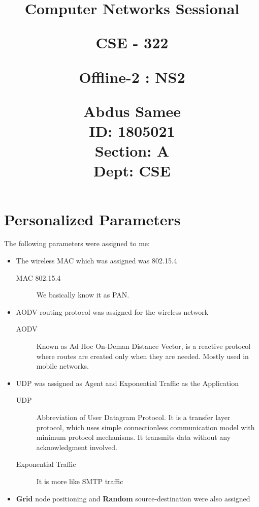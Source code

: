 \documentclass{article}
\title{%
  \begin{center}
        \vspace*{1cm}
            
        \Huge
        \textbf{Computer Networks Sessional}
            
        \vspace{0.5cm}
        \LARGE
        CSE - 322
            
        \vspace{1.5cm}
            
        \textbf{Offline-2 : NS2}
                        
        \vspace{0.8cm}
                        
        \Large
        Abdus Samee\\
        ID: 1805021\\
        Section: A\\
        Dept: CSE\\
    \end{center}
  }
\date{}
\begin{document}
\maketitle
\newpage

\section{Personalized Parameters}
The following parameters were assigned to me:

\begin{itemize}
     \item The wireless MAC which was assigned was 802.15.4
     \begin{description}
         \item[MAC 802.15.4] We basically know it as PAN.
     \end{description}
     \item AODV routing protocol was assigned for the wireless network
     \begin{description}
         \item[AODV] Known as Ad Hoc On-Deman Distance Vector, is a reactive protocol where routes are created only when they are needed. Mostly used in mobile networks.
     \end{description}
     \item UDP was assigned as Agent and Exponential Traffic as the Application
     \begin{description}
         \item[UDP] Abbreviation of User Datagram Protocol. It is a transfer layer protocol, which uses simple connectionless communication model with minimum protocol mechanisms. It transmits data without any acknowledgment involved.
         \item[Exponential Traffic] It is more like SMTP traffic
     \end{description}
     \item \textbf{Grid} node positioning and \textbf{Random} source-destination were also assigned
\end{itemize}
\end{document}
